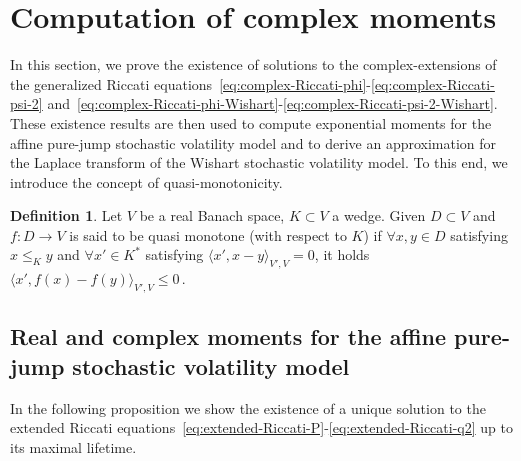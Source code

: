 \documentclass[10pt,a4paper,reqno]{amsart}
\numberwithin{equation}{section}
\theoremstyle{plain}
\theoremstyle{definition}
\newtheorem{definition}[theorem]{Definition}
\theoremstyle{example}
\begin{document}
\section{Computation of complex moments}\label{sec:complex-moments}

In this section, we prove the existence of solutions to the complex-extensions of the generalized Riccati equations~\eqref{eq:complex-Riccati-phi}-\eqref{eq:complex-Riccati-psi-2} and~\eqref{eq:complex-Riccati-phi-Wishart}-\eqref{eq:complex-Riccati-psi-2-Wishart}. These existence results are then used to compute exponential moments for the affine pure-jump stochastic volatility model and to derive an approximation for the Laplace transform of the Wishart stochastic volatility model. To this end, we introduce the concept of quasi-monotonicity.

\begin{definition}
    Let $V$ be a real Banach space, $K\subset V$ a wedge. Given $ D\subset V$ and $f\colon D\to V$ is said to be quasi monotone (with respect to $K$) if $\forall x,y \in D$ satisfying 
 $x\leq_{K}y$ and $\forall x' \in K^*$ satisfying  $\langle x', x-y\rangle_{V', V} =0$, it holds $\langle x', f(x)-f(y)\rangle_{V', V} \leq 0\,.$
\end{definition}

\subsection{Real and complex moments for the affine pure-jump stochastic volatility model}


In the following proposition we show the existence of a unique solution to the
extended Riccati equations~\eqref{eq:extended-Riccati-P}-\eqref{eq:extended-Riccati-q2} 
up to its maximal lifetime. 
\end{document}
